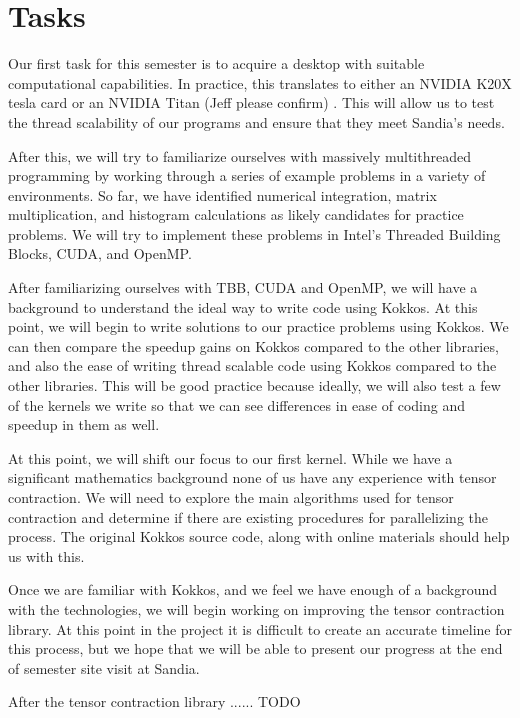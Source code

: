 \documentclass[proposal]{hmcclinic}
\begin{document}
\section{Tasks}

Our first task for this semester is to acquire a desktop with suitable
computational capabilities. In practice, this translates to either an NVIDIA
K20X tesla card or an NVIDIA Titan (Jeff please confirm) . This will allow us to
test the thread scalability of our programs and ensure that they meet Sandia's
needs.

After this, we will try to familiarize ourselves with massively multithreaded
programming by working through a series of example problems in a variety of
environments. So far, we have identified numerical integration, matrix
multiplication, and histogram calculations as likely candidates for practice
problems. We will try to implement these problems in Intel's Threaded Building
Blocks, CUDA, and OpenMP.

After familiarizing ourselves with TBB, CUDA and OpenMP, we will have a
background to understand the ideal way to write code using Kokkos. At this
point, we will begin to write solutions to our practice problems using Kokkos.
We can then compare the speedup gains on Kokkos compared to the other
libraries, and also the ease of writing thread scalable code using Kokkos
compared to the other libraries. This will be good practice because ideally, we
will also test a few of the kernels we write so that we can see differences in
ease of coding and speedup in them as well.

At this point, we will shift our focus to our first kernel.
While we have a significant mathematics background none of us have any
experience with tensor contraction.  We will need to explore the main
algorithms used for tensor contraction and determine if there are existing
procedures for parallelizing the process. The original Kokkos source code,
along with online materials should help us with this.

Once we are familiar with Kokkos, and we feel we have enough of a background
with the technologies, we will begin working on improving the tensor
contraction library. At this point in the project it is difficult to create an accurate timeline
for this process, but we hope that we will be able to present our progress at 
the end of semester site visit at Sandia.

After the tensor contraction library ...... TODO

\end{document}

